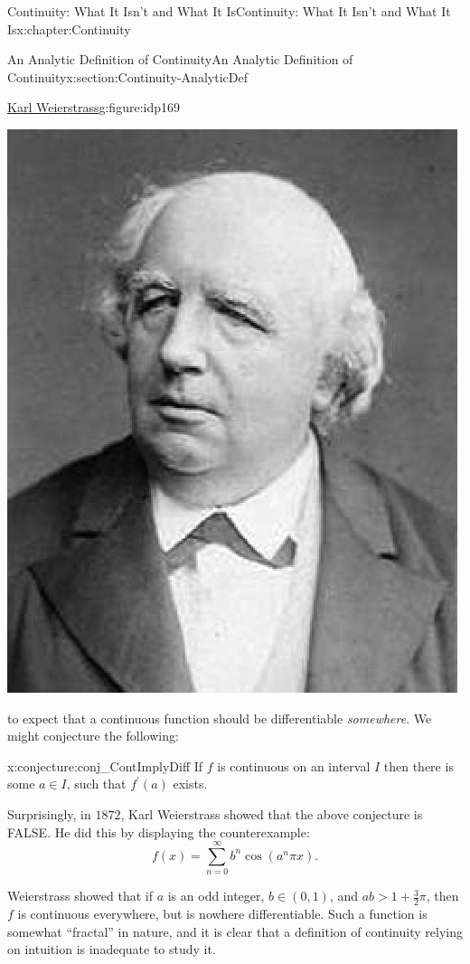 \begin{chapterptx}{Continuity: What It Isn't and What It Is}{}{Continuity: What It Isn't and What It Is}{}{}{x:chapter:Continuity}
\begin{sectionptx}{An Analytic Definition of Continuity}{}{An Analytic Definition of Continuity}{}{}{x:section:Continuity-AnalyticDef}
\begin{figureptx}{\href{https://mathshistory.st-andrews.ac.uk/Biographies/Weierstrass/}{Karl Weierstrass}\protect\footnotemark{}}{g:figure:idp169}{}
\begin{image}{0.325}{0.35}{0.325}
				\includegraphics[width=\linewidth]{external/images/Weierstrass.png}
			\end{image}%
			\tcblower
		\end{figureptx}%
		to expect that a continuous function should be differentiable \emph{somewhere}.  We might conjecture the following:%
		\begin{conjecture}{}{}{x:conjecture:conj_ContImplyDiff}%
			If \(f\) is continuous on an interval \(I\) then there is some \(a\in I\), such that \(f^\prime(a)\) exists.%
		\end{conjecture}
		Surprisingly, in \(1872\), Karl Weierstrass  showed that the above conjecture is \alert{FALSE}. He did this by displaying the counterexample:%
		\begin{equation*}
			f(x)=\sum_{n=0}^\infty b^n\cos(a^n\pi x)\text{.}
		\end{equation*}
		\par
		Weierstrass showed that if \(a\) is an odd integer, \(b\in(0,1)\), and \(ab>1+\frac{3}{2}\pi\), then \(f\) is continuous everywhere, but is nowhere differentiable.  Such a function is somewhat ``fractal'' in nature, and it is clear that a definition of continuity relying on intuition is inadequate to study it.%

\end{sectionptx}
\end{chapterptx}
